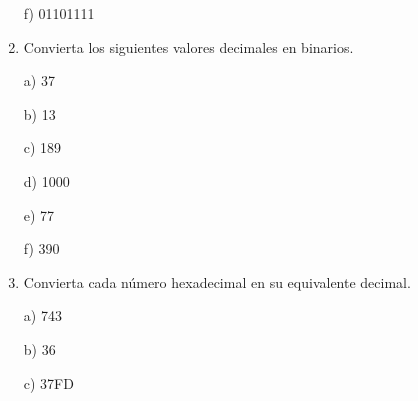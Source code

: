 \documentclass[a4paper, 12pt]{article}
\newcommand{\Aspace}{0.2cm}
\begin{document}
\begin{enumerate}
            \vspace{\Aspace} \par
            f) 01101111
            \\ { \color{azul}  }


        \item Convierta los siguientes valores decimales en binarios.
            \vspace{\Aspace} \par
            a) 37
            \\ { \color{azul}  }

            \vspace{\Aspace} \par
            b) 13
            \\ { \color{azul}  }

            \vspace{\Aspace} \par
            c) 189
            \\ { \color{azul}  }

            \vspace{\Aspace} \par
            d) 1000
            \\ { \color{azul}  }

            \vspace{\Aspace} \par
            e) 77
            \\ { \color{azul}  }

            \vspace{\Aspace} \par
            f) 390
            \\ { \color{azul}  }


        \newpage
        \item Convierta cada número hexadecimal en su equivalente decimal.
            \vspace{\Aspace} \par
            a) 743
            \\ { \color{azul}  }

            \vspace{\Aspace} \par
            b) 36
            \\ { \color{azul}  }

            \vspace{\Aspace} \par
            c) 37FD
            \\ { \color{azul}  }


\end{enumerate}
\end{document}
